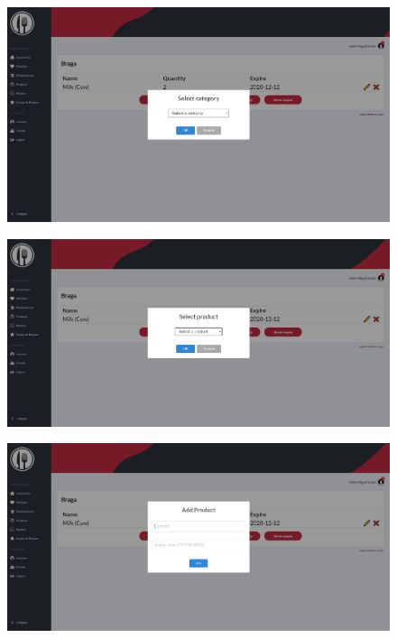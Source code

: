 \documentclass[a4paper]{report}
\begin{document}
    \begin{figure}[H]
        \centering
            \includegraphics[width=\textwidth]{images/produto_final/inserir_produto_categoria.png}
    \end{figure}

    \begin{figure}[H]
        \centering
            \includegraphics[width=\textwidth]{images/produto_final/inserir_produto_produto.png}
    \end{figure}

    \begin{figure}[H]
        \centering
            \includegraphics[width=\textwidth]{images/produto_final/inserir_produto_quantidade.png}
    \end{figure}
\end{document}
